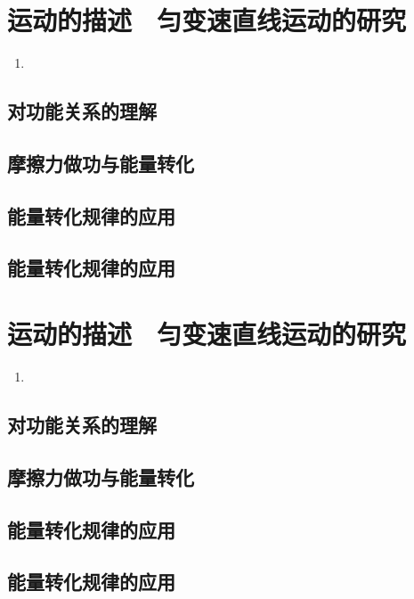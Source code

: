 \documentclass[cn,11pt]{elegantbook}
\begin{document}
\chapter{运动的描述　匀变速直线运动的研究}
\begin{enumerate}
   \item 
\end{enumerate}

\clearpage\section{对功能关系的理解}

\clearpage\section{摩擦力做功与能量转化}

\clearpage\section{能量转化规律的应用}

\clearpage\section{能量转化规律的应用}
\chapter{运动的描述　匀变速直线运动的研究}
\begin{enumerate}
   \item 
\end{enumerate}

\clearpage\section{对功能关系的理解}

\clearpage\section{摩擦力做功与能量转化}

\clearpage\section{能量转化规律的应用}

\clearpage\section{能量转化规律的应用}
\end{document}
